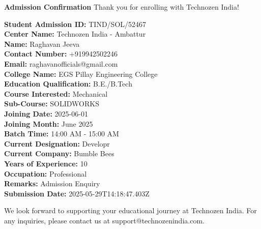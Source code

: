 \documentclass[a4paper,12pt]{article}
\begin{document}
\begin{center}
    \color{primaryGreen}
    \Large\textbf{Admission Confirmation}
    \vspace{0.5cm}
    \normalsize
    \color{black}
    Thank you for enrolling with Technozen India!
\end{center}

\vspace{0.5cm}

\noindent\textbf{Student Admission ID:} TIND/SOL/52467\\
\noindent\textbf{Center Name:} Technozen India - Ambattur\\
\noindent\textbf{Name:} Raghavan Jeeva\\
\noindent\textbf{Contact Number:} +919942502246\\
\noindent\textbf{Email:} raghavanofficials@gmail.com\\
\noindent\textbf{College Name:} EGS Pillay Engineering College\\
\noindent\textbf{Education Qualification:} B.E./B.Tech\\
\noindent\textbf{Course Interested:} Mechanical\\
\noindent\textbf{Sub-Course:} SOLIDWORKS\\
\noindent\textbf{Joining Date:} 2025-06-01\\
\noindent\textbf{Joining Month:} June 2025\\
\noindent\textbf{Batch Time:} 14:00 AM - 15:00 AM\\
\noindent\textbf{Current Designation:} Developr\\
\noindent\textbf{Current Company:} Bumble Bees\\
\noindent\textbf{Years of Experience:} 10\\
\noindent\textbf{Occupation:} Professional\\
\noindent\textbf{Remarks:} Admission Enquiry\\
\noindent\textbf{Submission Date:} 2025-05-29T14:18:47.403Z

\vspace{1cm}

\noindent\color{primaryOrange}
We look forward to supporting your educational journey at Technozen India. For any inquiries, please contact us at support@technozenindia.com.
\end{document}
